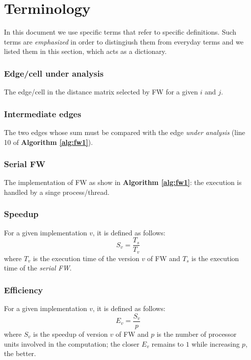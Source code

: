 \section{Terminology}
In this document we use specific terms that refer to specific definitions. Such terms are \emph{emphasized} in order to distingiush them from everyday terms
and we listed them in this section, which acts as a dictionary. 
\subsubsection*{Edge/cell under analysis} 
The edge/cell in the distance matrix selected by FW for a given $i$ and $j$.  
\subsubsection*{Intermediate edges} 
The two edges whose sum must be compared with the edge \emph{under analysis} (line 10 of \textbf{Algorithm \ref*{alg:fw1}}).
\subsubsection*{Serial FW} 
The implementation of FW as show in \textbf{Algorithm \ref*{alg:fw1}}: the execution is handled by a singe process/thread.
\subsubsection*{Speedup}
For a given implementation $v$, it is defined as follows:
\[S_{v} = \frac{T_{s}}{T_{v}}\]
where $T_v$ is the execution time of the version $v$ of FW and $T_s$ is the execution time of the \emph{serial FW}. 
\subsubsection*{Efficiency}
For a given implementation $v$, it is defined as follows:
\[E_v = \frac{S_v}{p}\]
where $S_v$ is the speedup of version $v$ of FW and $p$ is the number of processor units involved in the computation; the closer $E_v$ remains to $1$ while increasing $p$, the better.